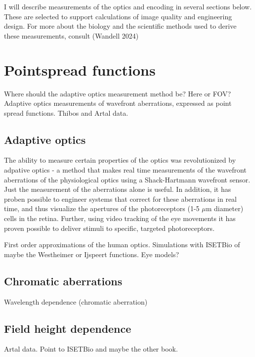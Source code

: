 \documentclass[
  letterpaper,
]{book}
\begin{document}
I will describe measurements of the optics and encoding in several
sections below. These are selected to support calculations of image
quality and engineering design. For more about the biology and the
scientific methods used to derive these measurements, consult (Wandell
2024)

\section{Pointspread functions}\label{pointspread-functions}

Where should the adaptive optics measurement method be? Here or FOV?
Adaptive optics measurements of wavefront aberrations, expressed as
point spread functions. Thibos and Artal data.

\subsection{Adaptive optics}\label{adaptive-optics}

The ability to measure certain properties of the optics was
revolutionized by adpative optics - a method that makes real time
measurements of the wavefront aberrations of the physiological optics
using a Shack-Hartmann wavefront sensor. Just the measurement of the
aberrations alone is useful. In addition, it has proben possible to
engineer systems that correct for these aberrations in real time, and
thus visualize the apertures of the photoreceptors (1-5 \(\mu \text{m}\)
diameter) cells in the retina. Further, using video tracking of the eye
movements it has proven possible to deliver stimuli to specific,
targeted photoreceptors.

First order approximations of the human optics. Simulations with ISETBio
of maybe the Westheimer or Ijspeert functions. Eye models?

\subsection{Chromatic aberrations}\label{chromatic-aberrations}

Wavelength dependence (chromatic aberration)

\subsection{Field height dependence}\label{field-height-dependence}

Artal data. Point to ISETBio and maybe the other book.
\end{document}
